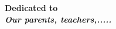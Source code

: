 \chapter*{ }
\label{dedication}
\thispagestyle{empty}
\begin{center}
\Huge\bf  Dedicated to\\
\Huge \em Our parents, teachers,.....\\[20ex]
\end{center}
